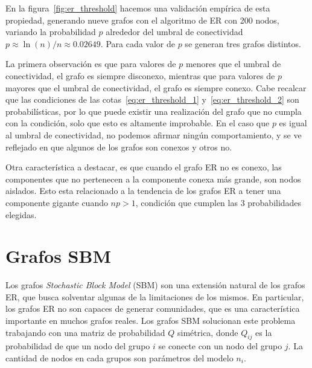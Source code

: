 \documentclass{article}
\begin{document}
En la figura~\ref{fig:er_threshold} hacemos una validación empírica de esta propiedad, generando nueve grafos
con el algoritmo de ER con 200 nodos, variando la probabilidad $p$ alrededor del umbral de conectividad $p \approx \ln(n)/n \approx 0.02649$. Para cada valor de $p$ se generan tres grafos distintos.

La primera observación es que para valores de $p$ menores que el umbral de conectividad, el grafo es siempre disconexo, mientras que para valores de $p$ mayores que el umbral de conectividad, el grafo es siempre conexo. Cabe recalcar que las condiciones de las cotas~\eqref{eq:er_threshold_1} y~\eqref{eq:er_threshold_2} son probabilísticas, por lo que puede existir una realización del grafo que no cumpla con la condición, solo
que esto es altamente improbable. En el caso que $p$ es igual al umbral de conectividad, no podemos afirmar ningún comportamiento, y se ve reflejado en que algunos de los grafos son conexos y otros no. 

Otra característica a destacar, es que cuando el grafo ER no es conexo, las componentes que no pertenecen
a la componente conexa más grande, son nodos aislados. Esto esta relacionado a la tendencia de los grafos ER
a tener una componente gigante cuando $np>1$, condición que cumplen las 3 probabilidades elegidas.

\section{Grafos SBM}

Los grafos \emph{Stochastic Block Model} (SBM) son una extensión natural de los grafos ER, que busca solventar algunas de la limitaciones de los mismos. En particular,
los grafos ER no son capaces de generar comunidades, que es una característica importante en muchos grafos reales. Los grafos SBM solucionan este problema trabajando
con una matriz de probabilidad $Q$ simétrica, donde $Q_{ij}$ es la probabilidad de que un nodo del grupo $i$ se conecte con un nodo del grupo $j$. La cantidad de nodos 
en cada grupos son parámetros del modelo $n_i$.
\end{document}

